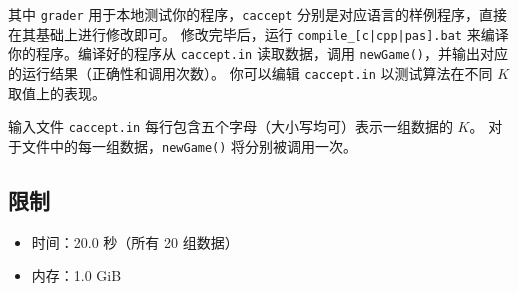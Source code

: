 \documentclass[UTF8, 11pt, a4paper]{article}
\begin{document}
其中 \texttt{grader} 用于本地测试你的程序，\texttt{caccept} %
分别是对应语言的样例程序，直接在其基础上进行修改即可。%
修改完毕后，运行 \texttt{compile\_[c|cpp|pas].bat} 来编译你的程序。编译好的程序从%
\texttt{caccept.in} 读取数据，调用 \texttt{newGame()}，并输出对应的运行结果（正确性和调用次数）。%
你可以编辑 \texttt{caccept.in} 以测试算法在不同 $K$ 取值上的表现。

输入文件 \texttt{caccept.in} 每行包含五个字母（大小写均可）表示一组数据的 $K$。%
对于文件中的每一组数据，\texttt{newGame()} 将分别被调用一次。

\subsection*{限制}
\begin{itemize}
\item 时间：20.0 秒（所有 20 组数据）
\item 内存：1.0 GiB
\end{itemize}

\end{document}
